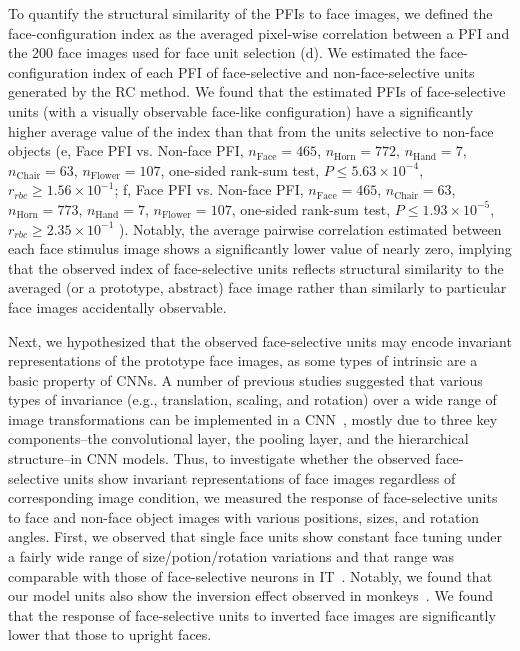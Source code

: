 \documentclass[sn-mathphys]{sn-jnl}%
\theoremstyle{thmstyleone}%
\theoremstyle{thmstyletwo}%
\theoremstyle{thmstylethree}%
\begin{document}
To quantify the structural similarity of the PFIs to face images, we defined the face-configuration index as the averaged pixel-wise correlation between a PFI and the 200 face images used for face unit selection (d).
We estimated the face-configuration index of each PFI of face-selective and non-face-selective units generated by the RC method.
We found that the estimated PFIs of face-selective units (with a visually observable face-like configuration) have a significantly higher average value of the index than that from the units selective to non-face objects (e, 
Face PFI vs. Non-face PFI, 
$ n_\textrm{Face}    = 465 $,
$ n_\textrm{Horn}    = 772 $,
$ n_\textrm{Hand}    = 7   $,
$ n_\textrm{Chair}   = 63  $,
$ n_\textrm{Flower}  = 107 $,
one-sided rank-sum test,
$ P \leq 5.63 \times 10^{-4} $,
$ r_{rbc} \geq 1.56 \times 10^{-1} $;
f, Face PFI vs. Non-face PFI,
$ n_\textrm{Face}   = 465 $,
$ n_\textrm{Chair}  = 63  $,
$ n_\textrm{Horn}	= 773 $,
$ n_\textrm{Hand}	= 7	  $,
$ n_\textrm{Flower}	= 107 $,
one-sided rank-sum test, 
$ P \leq 1.93 \times 10^{-5} $,
$ r_{rbc} \geq 2.35 \times 10^{-1} $
).
Notably, the average pairwise correlation estimated between each face stimulus image shows a significantly lower value of nearly zero, 
implying that the observed index of face-selective units reflects structural similarity to the averaged (or a prototype, abstract) face image rather than similarly to particular face images accidentally observable.


Next, we hypothesized that the observed face-selective units may encode invariant representations of the prototype face images, as some types of intrinsic are a basic property of CNNs.
A number of previous studies suggested that various types of invariance (e.g., translation, scaling, and rotation) over a wide range of image transformations can be implemented in a CNN~\cite{lecun2004learning,kavukcuoglu2010learning,lecun2012learning,chidester2018rotation,srivastava2018effect}, mostly due to three key components--the convolutional layer, the pooling layer, and the hierarchical structure--in CNN models.
Thus, to investigate whether the observed face-selective units show invariant representations of face images regardless of corresponding image condition, 
we measured the response of face-selective units to face and non-face object images with various positions, sizes, and rotation angles.
First, we observed that single face units show constant face tuning under a fairly wide range of size/potion/rotation variations and that range was comparable with those of face-selective neurons in IT~\cite{zoccolan2007trade}.
Notably, we found that our model units also show the inversion effect observed in monkeys~\cite{tsao2006cortical,buiatti2019cortical,perrett1985visual}.
We found that the response of face-selective units to inverted face images are significantly lower that those to upright faces.
\end{document}
